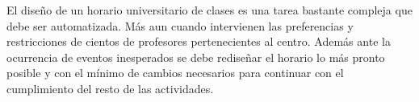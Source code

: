 \begin{conclusions}

El diseño de un horario universitario de clases es una tarea bastante compleja que debe ser automatizada. M\'as aun cuando intervienen las preferencias y restricciones de cientos de profesores pertenecientes al centro. Adem\'as ante la ocurrencia de eventos inesperados se debe rediseñar el horario lo m\'as pronto posible y con el m\'inimo de cambios necesarios para continuar con el cumplimiento del resto de las actividades.

\end{conclusions}